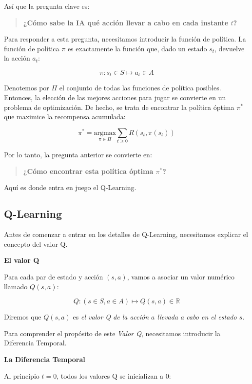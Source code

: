 \documentclass[
]{book}
\begin{document}
Así que la pregunta clave es:

\begin{quote}
\textbf{¿Cómo sabe la IA qué acción llevar a cabo en cada instante \(t\)?}
\end{quote}

Para responder a esta pregunta, necesitamos introducir la función de política. La función de política \(\pi\) es exactamente la función que, dado un estado \(s_t\), devuelve la acción \(a_t\):

\[\pi: s_t \in S \mapsto a_t \in A\]

Denotemos por \(\Pi\) el conjunto de todas las funciones de política posibles. Entonces, la elección de las mejores acciones para jugar se convierte en un problema de optimización. De hecho, se trata de encontrar la política óptima \(\pi^*\) que maximice la recompensa acumulada:

\[\pi^* = \underset{\pi \in \Pi}{\textrm{argmax}} \sum_{t \ge 0} R(s_t,\pi(s_t))\]

Por lo tanto, la pregunta anterior se convierte en:

\begin{quote}
\textbf{¿Cómo encontrar esta política óptima \(\pi^*\)?}
\end{quote}

Aquí es donde entra en juego el Q-Learning.

\hypertarget{q-learning}{%
\subsection{Q-Learning}\label{q-learning}}

Antes de comenzar a entrar en los detalles de Q-Learning, necesitamos explicar el concepto del valor Q.

\textbf{El valor Q}

Para cada par de estado y acción \((s, a)\), vamos a asociar un valor numérico llamado \(Q (s, a)\):

\[Q: (s \in S, a \in A) \mapsto Q(s,a) \in \mathbb{R}\]

Diremos que \(Q (s, a)\) es \emph{el valor Q de la acción \(a\) llevada a cabo en el estado \(s\)}.

Para comprender el propósito de este \emph{Valor Q}, necesitamos introducir la Diferencia Temporal.

\textbf{La Diferencia Temporal}

Al principio \(t = 0\), todos los valores Q se inicializan a 0:
\end{document}
